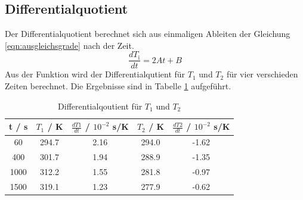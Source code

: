 \subsection{Differentialquotient}
Der Differentialquotient berechnet sich aus einmaligen Ableiten der Gleichung \ref{eqn:ausgleichsgrade} nach der Zeit.
\begin{equation}
  \frac{dT_\text{i}}{dt} = 2At + B
  \label{eqn:diffq}
\end{equation}
Aus der Funktion wird der Differentialqutient für $T_\text{1}$ und $T_\text{2}$ für vier verschieden Zeiten berechnet. Die Ergebnisse sind in Tabelle \ref{tab:diffQ} aufgeführt.
\begin{table}
  \centering
  \begin{tabular}{c c c c c}
  	\toprule
	t / s & $T_\text{1}$ / K & $\frac{dT1}{dt}$ / $10^{-2}$ s/K & $T_\text{2}$ / K & $\frac{dT2}{dt}$ / $10^{-2}$ s/K \\
	\midrule
	60	  & 294.7   & 2.16 & 294.0 & -1.62 \\
	400	  & 301.7   & 1.94 & 288.9 & -1.35 \\
	1000	& 312.2   & 1.55 & 281.8 & -0.97 \\
	1500	& 319.1   & 1.23 & 277.9 & -0.62 \\
	\bottomrule
  \end{tabular}
  \caption{Differentialqoutient für $T_\text{1}$ und $T_\text{2}$}
  \label{tab:diffQ}
\end{table}

